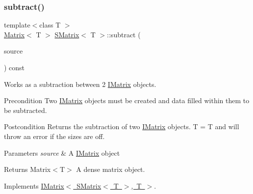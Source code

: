 \subsubsection{\texorpdfstring{subtract()}{subtract()}\hspace{0.1cm}{\footnotesize\ttfamily [5/6]}}
{\footnotesize\ttfamily template$<$class T $>$ \\
\mbox{\hyperlink{class_matrix}{Matrix}}$<$ T $>$ \mbox{\hyperlink{class_s_matrix}{S\+Matrix}}$<$ T $>$\+::subtract (\begin{DoxyParamCaption}\item[{const \mbox{\hyperlink{class_i_matrix}{I\+Matrix}}$<$ \mbox{\hyperlink{class_s_matrix}{S\+Matrix}}$<$ T $>$, T $>$ \&}]{source }\end{DoxyParamCaption}) const\hspace{0.3cm}{\ttfamily [virtual]}}



Works as a subtraction between 2 \mbox{\hyperlink{class_i_matrix}{I\+Matrix}} objects. 

\begin{DoxyPrecond}{Precondition}
Two \mbox{\hyperlink{class_i_matrix}{I\+Matrix}} objects must be created and data filled within them to be subtracted. 
\end{DoxyPrecond}
\begin{DoxyPostcond}{Postcondition}
Returns the subtraction of two \mbox{\hyperlink{class_i_matrix}{I\+Matrix}} objects. T = T and will throw an error if the sizes are off.
\end{DoxyPostcond}

\begin{DoxyParams}{Parameters}
{\em source} & A \mbox{\hyperlink{class_i_matrix}{I\+Matrix}} object \\
\hline
\end{DoxyParams}
\begin{DoxyReturn}{Returns}
Matrix$<$\+T$>$ A dense matrix object. 
\end{DoxyReturn}


Implements \mbox{\hyperlink{class_i_matrix_a0bf5046efed75799656059ce2980a851}{I\+Matrix$<$ S\+Matrix$<$ T $>$, T $>$}}.

\mbox{\label{class_s_matrix_a4fe3bb72a4fa1173189112fd33f3c887}} 
